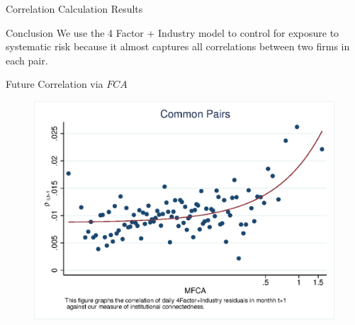 \documentclass{beamer}
\begin{document}
	\begin{frame}{Correlation Calculation Results}
		
		
%		
		
		
		\begin{table}[htbp]
			\centering 
			\scriptsize
			\resizebox{0.8\textwidth}{!}{
				              
			}
		\end{table}
		
		
		\begin{block}{Conclusion}
			\scriptsize
			We use the 4 Factor + Industry model to control for exposure to systematic risk because it almost captures all correlations between two firms in each pair.
		\end{block}
	\end{frame}
	
	
	\begin{frame}{Future Correlation via $ FCA $}
		\begin{figure}
			\centering  
			\includegraphics[width=0.85\linewidth]{"Output/mcorr50.eps"}
		\end{figure}
	\end{frame}   
	
\end{document}
